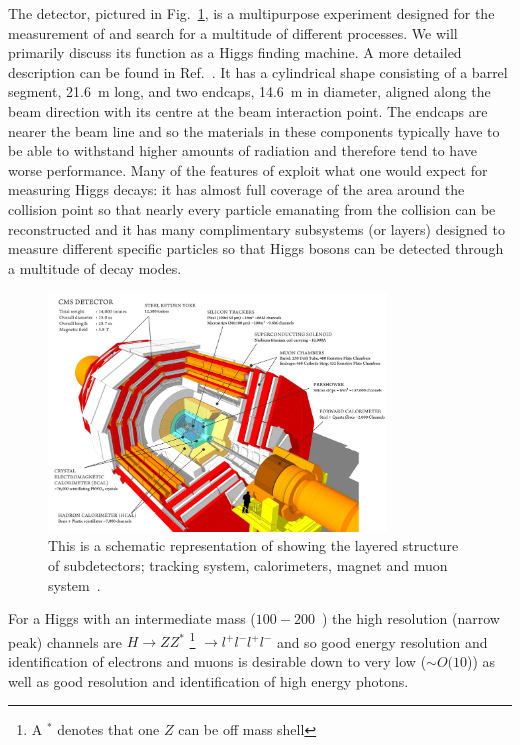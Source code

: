 The \CMS detector, pictured in Fig.~\ref{fig:cms_diagram}, is a multipurpose experiment designed for the measurement of and search for a multitude of different processes. We will primarily discuss its function as a Higgs finding machine. A more detailed description can be found in Ref.~\cite{CMS_JINST}. It has a cylindrical shape consisting of a barrel segment, 21.6~m long, and two endcaps, 14.6~m in diameter, aligned along the beam direction with its centre at the beam interaction point. The endcaps are nearer the beam line and so the materials in these components typically have to be able to withstand higher amounts of radiation and therefore tend to have worse performance. Many of the features of \CMS exploit what one would expect for measuring Higgs decays: it has almost full coverage of the area around the collision point so that nearly every particle emanating from the collision can be reconstructed and it has many complimentary subsystems (or layers) designed to measure different specific particles so that Higgs bosons can be detected through a multitude of decay modes. 

\begin{figure}
  \includegraphics[width=0.8\textwidth]{cms_experiment/plots/cms_diagram.png}
  \caption[\acs{CMS} diagram]{This is a schematic representation of \CMS showing the layered structure of subdetectors; tracking system, calorimeters, magnet and muon system~\cite{cms_schematic}.}
  \label{fig:cms_diagram}
\end{figure}


For a Higgs with an intermediate mass ($100 - 200$~\GeV) the high resolution (narrow peak) channels are $H\rightarrow ZZ^{*}$ \footnote{A $^{*}$ denotes that one $Z$ can be off mass shell} $\rightarrow l^{+}l^{-}l^{+}l^{-}$ and \Hgg so good energy resolution and identification of electrons and muons is desirable down to very low \pT ($\sim O(10$\GeV)) as well as good resolution and identification of high energy photons. 

